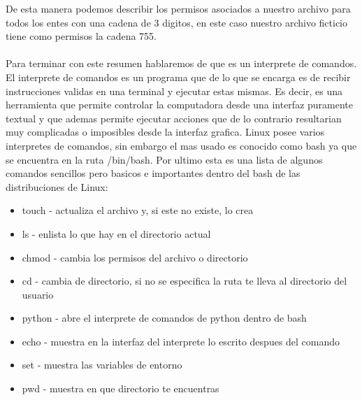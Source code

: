 \documentclass[letterpaper, 12pt, oneside]{article}
\begin{document}
	De esta manera podemos describir los permisos asociados a nuestro archivo para todos los entes con una cadena de 3 digitos, en este caso nuestro archivo ficticio tiene como permisos la cadena 755.
	\\
	\\
	Para terminar con este resumen hablaremos de que es un interprete de comandos. El interprete de comandos es un programa que de lo que se encarga es de recibir instrucciones validas en una terminal y ejecutar estas mismas. Es decir, es una herramienta que permite controlar la computadora desde una interfaz puramente textual y que ademas permite ejecutar acciones que de lo contrario resultarian muy complicadas o imposibles desde la interfaz grafica. Linux posee varios interpretes de comandos, sin embargo el mas usado es conocido como bash ya que se encuentra en la ruta /bin/bash. Por ultimo esta es una lista de algunos comandos sencillos pero basicos e importantes dentro del bash de las distribuciones de Linux:
	\\
	\begin{itemize}
		\item touch - actualiza el archivo y, si este no existe, lo crea
		\item ls - enlista lo que hay en el directorio actual
		\item chmod - cambia los permisos del archivo o directorio
		\item cd - cambia de directorio, si no se especifica la ruta te lleva al directorio del usuario
		\item python - abre el interprete de comandos de python dentro de bash
		\item echo - muestra en la interfaz del interprete lo escrito despues del comando
		\item set - muestra las variables de entorno
		\item pwd - muestra en que directorio te encuentras
	\\
	\end{itemize}
\end{document}

